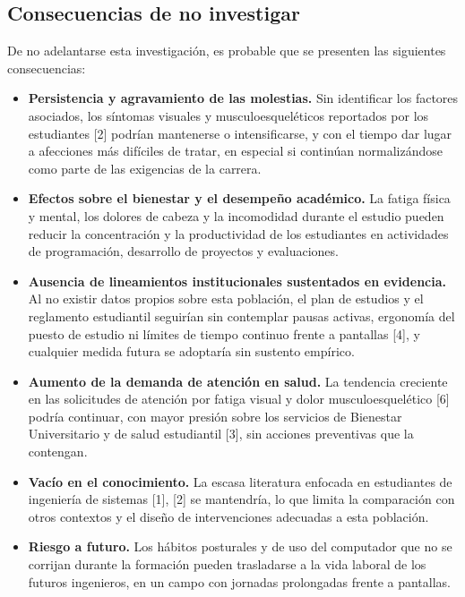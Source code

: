 \subsection{Consecuencias de no investigar}

De no adelantarse esta investigación, es probable que se presenten las siguientes
consecuencias:

\begin{itemize}
  \item \textbf{Persistencia y agravamiento de las molestias.} Sin identificar los
  factores asociados, los síntomas visuales y musculoesqueléticos reportados por los
  estudiantes [2] podrían mantenerse o intensificarse, y con el tiempo dar lugar a
  afecciones más difíciles de tratar, en especial si continúan normalizándose como parte
  de las exigencias de la carrera.
  \item \textbf{Efectos sobre el bienestar y el desempeño académico.} La fatiga física y
  mental, los dolores de cabeza y la incomodidad durante el estudio pueden reducir la
  concentración y la productividad de los estudiantes en actividades de programación,
  desarrollo de proyectos y evaluaciones.
  \item \textbf{Ausencia de lineamientos institucionales sustentados en evidencia.} Al no
  existir datos propios sobre esta población, el plan de estudios y el reglamento
  estudiantil seguirían sin contemplar pausas activas, ergonomía del puesto de estudio ni
  límites de tiempo continuo frente a pantallas [4], y cualquier medida futura se
  adoptaría sin sustento empírico.
  \item \textbf{Aumento de la demanda de atención en salud.} La tendencia creciente en las
  solicitudes de atención por fatiga visual y dolor musculoesquelético [6] podría
  continuar, con mayor presión sobre los servicios de Bienestar Universitario y de salud
  estudiantil [3], sin acciones preventivas que la contengan.
  \item \textbf{Vacío en el conocimiento.} La escasa literatura enfocada en estudiantes
  de ingeniería de sistemas [1], [2] se mantendría, lo que limita la comparación con otros
  contextos y el diseño de intervenciones adecuadas a esta población.
  \item \textbf{Riesgo a futuro.} Los hábitos posturales y de uso del computador que no se
  corrijan durante la formación pueden trasladarse a la vida laboral de los futuros
  ingenieros, en un campo con jornadas prolongadas frente a pantallas.
\end{itemize}

